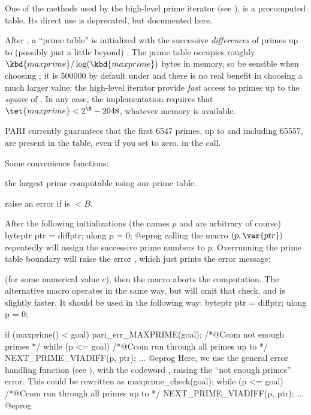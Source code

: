 One of the methods used by the high-level prime iterator (see
), is a precomputed table. Its direct use is deprecated,
but documented here.

After , a ``prime table'' is
initialized with the successive \emph{differences} of primes up to (possibly
just a little beyond) . The prime table occupies roughly
$\kbd{maxprime}/\log(\kbd{maxprime})$ bytes in memory, so be sensible when
choosing ; it is $500000$ by default under  and there
is no real benefit in choosing a much larger value: the high-level
iterator provide \emph{fast} access to primes up to the \emph{square}
of . In any case, the implementation requires that
$\tet{maxprime} < 2^{\B} - 2048$, whatever memory is available.

PARI currently guarantees that the first 6547 primes, up to and including
65557, are present in the table, even if you set  to zero.
in the  call.

\noindent Some convenience functions:

 the largest prime computable using our prime table.

 raise an error if  is $< B$.

After the following initializations (the names $p$ and  are
arbitrary of course)
\bprog
byteptr ptr = diffptr;
ulong p = 0;
@eprog
\noindent calling the macro $(p, \var{ptr})$
repeatedly will assign the successive prime numbers to $p$. Overrunning the
prime table boundary will raise the error , which just
prints the error message:


\noindent (for some numerical value $c$), then the macro aborts the
computation. The alternative macro  operates in the
same way, but will omit that check, and is slightly faster. It should be used
in the following way:
%
\bprog
byteptr ptr = diffptr;
ulong p = 0;

if (maxprime() < goal) pari_err_MAXPRIME(goal); /*@Ccom not enough primes */
while (p <= goal) /*@Ccom run through all primes up to  */
{
  NEXT_PRIME_VIADIFF(p, ptr);
  ...
}
@eprog\noindent
Here, we use the general error handling function  (see
), with the codeword , raising the ``not enough
primes'' error. This could be rewritten as
\bprog
maxprime_check(goal);
while (p <= goal) /*@Ccom run through all primes up to  */
{
  NEXT_PRIME_VIADIFF(p, ptr);
  ...
}
@eprog

